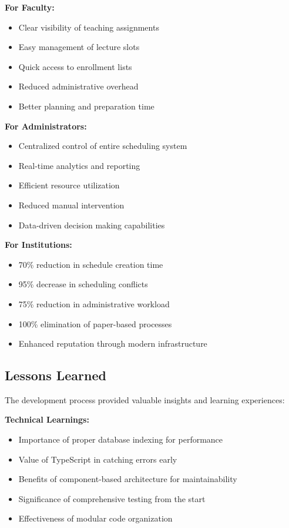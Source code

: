 \textbf{For Faculty:}
\begin{itemize}
    \item Clear visibility of teaching assignments
    \item Easy management of lecture slots
    \item Quick access to enrollment lists
    \item Reduced administrative overhead
    \item Better planning and preparation time
\end{itemize}

\textbf{For Administrators:}
\begin{itemize}
    \item Centralized control of entire scheduling system
    \item Real-time analytics and reporting
    \item Efficient resource utilization
    \item Reduced manual intervention
    \item Data-driven decision making capabilities
\end{itemize}

\textbf{For Institutions:}
\begin{itemize}
    \item 70\% reduction in schedule creation time
    \item 95\% decrease in scheduling conflicts
    \item 75\% reduction in administrative workload
    \item 100\% elimination of paper-based processes
    \item Enhanced reputation through modern infrastructure
\end{itemize}

\subsection{Lessons Learned}

The development process provided valuable insights and learning experiences:

\textbf{Technical Learnings:}
\begin{itemize}
    \item Importance of proper database indexing for performance
    \item Value of TypeScript in catching errors early
    \item Benefits of component-based architecture for maintainability
    \item Significance of comprehensive testing from the start
    \item Effectiveness of modular code organization
\end{itemize}

